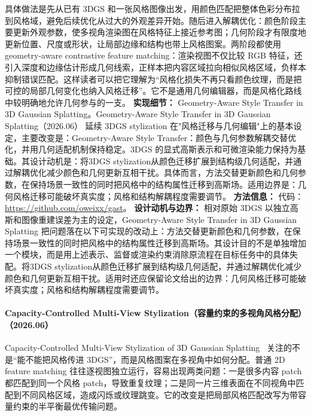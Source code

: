 具体做法是先从已有 3DGS 和一张风格图像出发，用颜色匹配把整体色彩分布拉到风格域，避免后续优化从过大的外观差异开始。随后进入解耦优化：颜色阶段主要更新外观参数，使多视角渲染图在风格特征上接近参考图；几何阶段才有限度地更新位置、尺度或形状，让局部边缘和结构也带上风格图案。两阶段都使用 geometry-aware contrastive feature matching：渲染视图不仅比较 RGB 特征，还引入深度和边缘估计形成几何线索，正样本把内容区域拉向相似风格区域，负样本抑制错误匹配。这样读者可以把它理解为“风格化损失不再只看颜色纹理，而是把可控的局部几何变化也纳入风格迁移”。它不是通用几何编辑器，而是风格化路线中较明确地允许几何参与的一支。
\textbf{实现细节：} Geometry-Aware Style Transfer in 3D Gaussian Splatting。Geometry-Aware Style Transfer in 3D Gaussian Splatting（2026.06） 延续 3DGS stylization 在"风格迁移与几何编辑"上的基本设定，主要改变是：Geometry-Aware Style Transfer：颜色与几何参数解耦交替优化，并用几何适配机制保持稳定。3DGS 的显式高斯表示和可微渲染能力保持为基础。其设计动机是：将3DGS stylization从颜色迁移扩展到结构级几何适配，并通过解耦优化减少颜色和几何更新互相干扰。具体而言，方法交替更新颜色和几何参数，在保持场景一致性的同时把风格中的结构属性迁移到高斯场。适用边界是：几何风格迁移可能破坏真实度；风格和结构解耦程度需要调节。
\textbf{方法信息：} 代码：\url{https://github.com/oweixx/gast}。
\textbf{设计动机与边界：} 相对原始 3DGS 以独立高斯和图像重建误差为主的设定，Geometry-Aware Style Transfer in 3D Gaussian Splatting 把问题落在以下可实现的改动上：方法交替更新颜色和几何参数，在保持场景一致性的同时把风格中的结构属性迁移到高斯场。其设计目的不是单独增加一个模块，而是用上述表示、监督或渲染约束消除原流程在目标任务中的具体失配。将3DGS stylization从颜色迁移扩展到结构级几何适配，并通过解耦优化减少颜色和几何更新互相干扰。适用时还应保留论文给出的边界：几何风格迁移可能破坏真实度；风格和结构解耦程度需要调节。
\paragraph{Capacity-Controlled Multi-View Stylization（容量约束的多视角风格分配）（2026.06）}
Capacity-Controlled Multi-View Stylization of 3D Gaussian Splatting~\cite{2606_26754} 关注的不是“能不能把风格传进 3DGS”，而是风格图案在多视角中如何分配。普通 2D feature matching 往往逐视图独立运行，容易出现两类问题：一是很多内容 patch 都匹配到同一个风格 patch，导致重复纹理；二是同一片三维表面在不同视角中匹配到不同风格区域，造成闪烁或纹理跳变。它的改变是把局部风格匹配改写为带容量约束的半平衡最优传输问题。

